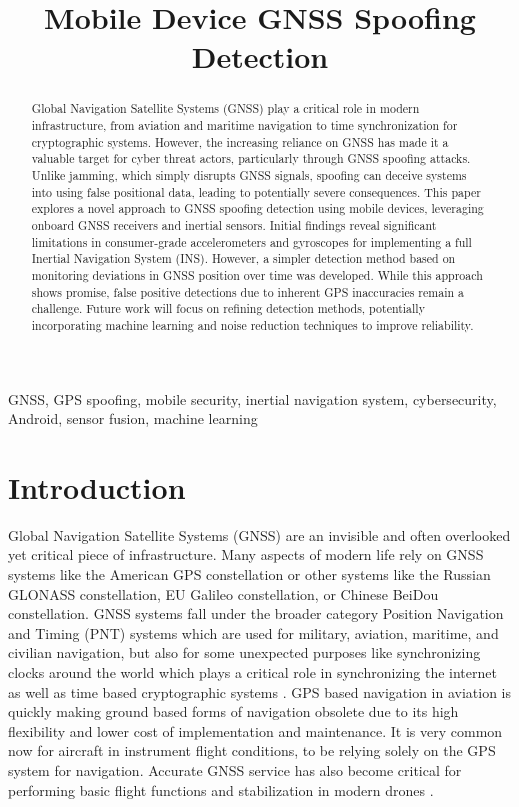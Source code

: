 \documentclass[conference]{IEEEtran}
\title{Mobile Device GNSS Spoofing Detection}
\author{
    \IEEEauthorblockN{Nathan Johnson}
    \IEEEauthorblockA{
        Embry-Riddle Aeronautical University\\
        Prescott, Arizona, USA\\
        johnsn63@my.erau.edu
    }
}
\begin{document}
\maketitle

\begin{abstract}
Global Navigation Satellite Systems (GNSS) play a critical role in modern infrastructure, from aviation and maritime navigation to time synchronization for cryptographic systems. However, the increasing reliance on GNSS has made it a valuable target for cyber threat actors, particularly through GNSS spoofing attacks. Unlike jamming, which simply disrupts GNSS signals, spoofing can deceive systems into using false positional data, leading to potentially severe consequences. This paper explores a novel approach to GNSS spoofing detection using mobile devices, leveraging onboard GNSS receivers and inertial sensors. Initial findings reveal significant limitations in consumer-grade accelerometers and gyroscopes for implementing a full Inertial Navigation System (INS). However, a simpler detection method based on monitoring deviations in GNSS position over time was developed. While this approach shows promise, false positive detections due to inherent GPS inaccuracies remain a challenge. Future work will focus on refining detection methods, potentially incorporating machine learning and noise reduction techniques to improve reliability.
\end{abstract}

\begin{IEEEkeywords}
GNSS, GPS spoofing, mobile security, inertial navigation system, cybersecurity, Android, sensor fusion, machine learning
\end{IEEEkeywords}
    

\section{Introduction}
Global Navigation Satellite Systems (GNSS) are an invisible and often overlooked yet critical piece of infrastructure.  Many aspects of modern life rely on GNSS systems like the American GPS constellation or other systems like the Russian GLONASS constellation, EU Galileo constellation, or Chinese BeiDou constellation.  GNSS systems fall under the broader category Position Navigation and Timing (PNT) systems which are used for military, aviation, maritime, and civilian navigation, but also for some unexpected purposes like synchronizing clocks around the world which plays a critical role in synchronizing the internet as well as time based cryptographic systems \cite{lu2021}. GPS based navigation in aviation is quickly making ground based forms of navigation obsolete due to its high flexibility and lower cost of implementation and maintenance.  It is very common now for aircraft in instrument flight conditions, to be relying solely on the GPS system for navigation. Accurate GNSS service has also become critical for performing basic flight functions and stabilization in modern drones \cite{meng2021}.
\end{document}
